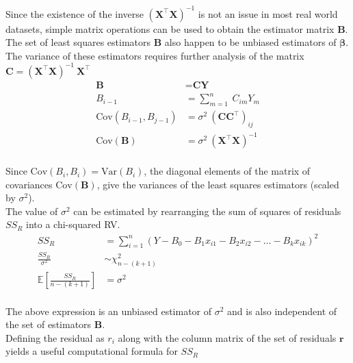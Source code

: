 Since the existence of the inverse $ (\textbf{X}^\intercal \textbf{X})^{-1}  $ is not an issue in most real world datasets, simple matrix operations can be used to obtain the estimator matrix $ \textbf{B} $.\\

The set of least squares estimators $ \textbf{B} $ also happen to be unbiased estimators of $ \boldsymbol{\beta} $. The variance of these estimators requires further analysis of the matrix $ \textbf{C} = (\textbf{X}^\intercal \textbf{X})^{-1}\  \textbf{X}^\intercal$\\

\begin{align}
	\textbf{B} &= \textbf{C}\textbf{Y} \nonumber \\
	B_{i-1} &= \sum\limits_{m = 1}^{n}\ C_{im} Y_m \\
	\mathrm{Cov}(B_{i-1}, B_{j-1}) &= \sigma^2\ (\textbf{C} \textbf{C}^\intercal)_{ij} \\
	\mathrm{Cov}(\textbf{B}) &= \sigma^2\ (\textbf{X}^\intercal \textbf{X})^{-1} 
\end{align}\\

Since $ \mathrm{Cov}(B_i, B_i) = \mathrm{Var}(B_i) $, the diagonal elements of the matrix of covariances $ \mathrm{Cov}(\textbf{B}) $, give the variances of the least squares estimators (scaled by $ \sigma^2 $).\\

The value of $ \sigma^2 $ can be estimated by rearranging the sum of squares of residuals $ SS_R $ into a chi-squared RV.\\

\begin{align}
	SS_R &= \sum\limits_{i = 1}^{n} (Y - B_0 - B_1 x_{i1} - B_2 x_{i2} - \dots - B_k x_{ik})^2 \nonumber \\
	\frac{SS_R}{\sigma^2} &\sim \chi^2_{n-(k+1)} \\
	\mathbb{E}\left[\frac{SS_R}{n- (k+1)}\right] &= \sigma^2
\end{align}\\

The above expression is an unbiased estimator of $ \sigma^2 $ and is also independent of the set of estimators $ \textbf{B} $.\\

Defining the residual as $ r_i $ along with the column matrix of the set of residuals $ \textbf{r} $ yields a useful computational formula for $ SS_R $ \\

